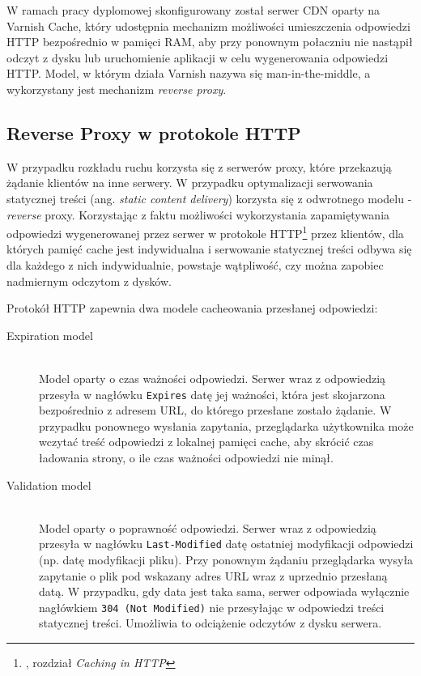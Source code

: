 W ramach pracy dyplomowej skonfigurowany został serwer CDN oparty na Varnish Cache, który udostępnia mechanizm możliwości umieszczenia odpowiedzi HTTP bezpośrednio w pamięci RAM, aby przy ponownym połaczniu nie nastąpił odczyt z dysku lub uruchomienie aplikacji w celu wygenerowania odpowiedzi HTTP. Model, w którym działa Varnish nazywa się man-in-the-middle, a wykorzystany jest mechanizm \emph{reverse proxy}.

\subsection{Reverse Proxy w protokole HTTP}

W przypadku rozkładu ruchu korzysta się z serwerów proxy, które przekazują żądanie klientów na inne serwery. W przypadku optymalizacji serwowania statycznej treści (ang. \emph{static content delivery}) korzysta się z odwrotnego modelu - \emph{reverse} proxy. Korzystając z faktu możliwości wykorzystania zapamiętywania odpowiedzi wygenerowanej przez serwer w protokole HTTP\cite{http-rfc}\footnote{\cite{http-rfc}, rozdział \emph{Caching in HTTP}} przez klientów, dla których pamięć cache jest indywidualna i serwowanie statycznej treści odbywa się dla każdego z nich indywidualnie, powstaje wątpliwość, czy można zapobiec nadmiernym odczytom z dysków.

Protokół HTTP zapewnia dwa modele cacheowania przesłanej odpowiedzi:

\begin{description}
  \item[Expiration model] \hfill \\
  Model oparty o czas ważności odpowiedzi. Serwer wraz z odpowiedzią przesyła w nagłówku \lstinline{Expires} datę jej ważności, która jest skojarzona bezpośrednio z adresem URL, do którego przesłane zostało żądanie. W przypadku ponownego wysłania zapytania, przeglądarka użytkownika może wczytać treść odpowiedzi z lokalnej pamięci cache, aby skrócić czas ładowania strony, o ile czas ważności odpowiedzi nie minął.
  \item[Validation model] \hfill \\
  Model oparty o poprawność odpowiedzi. Serwer wraz z odpowiedzią przesyła w nagłówku \lstinline{Last-Modified} datę ostatniej modyfikacji odpowiedzi (np. datę modyfikacji pliku). Przy ponownym żądaniu przeglądarka wysyła zapytanie o plik pod wskazany adres URL wraz z uprzednio przesłaną datą. W przypadku, gdy data jest taka sama, serwer odpowiada wyłącznie nagłówkiem \lstinline{304 (Not Modified)} nie przesyłając w odpowiedzi treści statycznej treści. Umożliwia to odciążenie odczytów z dysku serwera.
\end{description}

